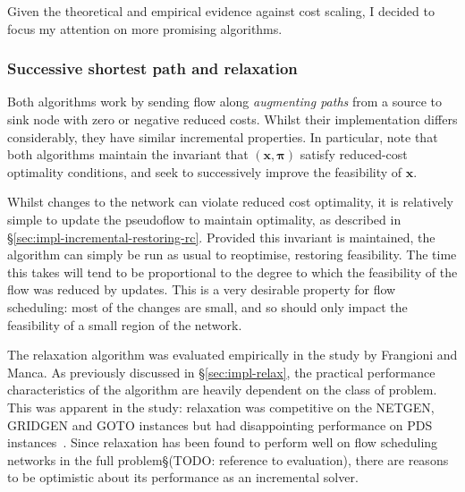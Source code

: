 Given the theoretical and empirical evidence against cost scaling, I decided to focus my attention on more promising algorithms.

\subsubsection{Successive shortest path and relaxation}

Both algorithms work by sending flow along \emph{augmenting paths} from a source to sink node with zero or negative reduced costs. Whilst their implementation differs considerably, they have similar incremental properties. In particular, note that both algorithms maintain the invariant that $\left(\mathbf{x},\boldsymbol{\pi}\right)$ satisfy reduced-cost optimality conditions, and seek to successively improve the feasibility of $\mathbf{x}$\footnotemark.

Whilst changes to the network can violate reduced cost optimality, it is relatively simple to update the pseudoflow to maintain optimality, as described in \S\ref{sec:impl-incremental-restoring-rc}. Provided this invariant is maintained, the algorithm can simply be run as usual to reoptimise, restoring feasibility. The time this takes will tend to be proportional to the degree to which the feasibility of the flow was reduced by updates\footnotemark. This is a very desirable property for flow scheduling: most of the changes are small, and so should only impact the feasibility of a small region of the network.

The relaxation algorithm was evaluated empirically in the study by Frangioni and Manca. As previously discussed in \S\ref{sec:impl-relax}, the practical performance characteristics of the algorithm are heavily dependent on the class of problem. This was apparent in the study: relaxation was competitive on the NETGEN, GRIDGEN and GOTO instances but had disappointing performance on PDS instances~\cite[tables~1~to~4]{Frangioni:2006}. Since relaxation has been found to perform well on flow scheduling networks in the full problem\S(TODO: reference to evaluation), there are reasons to be optimistic about its performance as an incremental solver.

